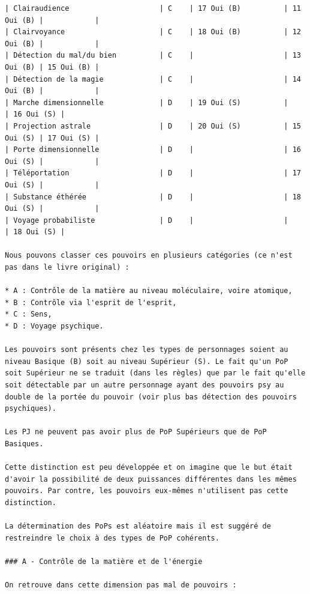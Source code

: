 \documentclass[12pt]{article}
\begin{document}
{\begin{verbatim}
| Clairaudience                     | C    | 17 Oui (B)          | 11 Oui (B) |            |
| Clairvoyance                      | C    | 18 Oui (B)          | 12 Oui (B) |            |
| Détection du mal/du bien          | C    |                     | 13 Oui (B) | 15 Oui (B) |
| Détection de la magie             | C    |                     | 14 Oui (B) |            |
| Marche dimensionnelle             | D    | 19 Oui (S)          |            | 16 Oui (S) |
| Projection astrale                | D    | 20 Oui (S)          | 15 Oui (S) | 17 Oui (S) |
| Porte dimensionnelle              | D    |                     | 16 Oui (S) |            |
| Téléportation                     | D    |                     | 17 Oui (S) |            |
| Substance éthérée                 | D    |                     | 18 Oui (S) |            |
| Voyage probabiliste               | D    |                     |            | 18 Oui (S) |

Nous pouvons classer ces pouvoirs en plusieurs catégories (ce n'est pas dans le livre original) :

* A : Contrôle de la matière au niveau moléculaire, voire atomique,
* B : Contrôle via l'esprit de l'esprit,
* C : Sens,
* D : Voyage psychique.

Les pouvoirs sont présents chez les types de personnages soient au niveau Basique (B) soit au niveau Supérieur (S). Le fait qu'un PoP soit Supérieur ne se traduit (dans les règles) que par le fait qu'elle soit détectable par un autre personnage ayant des pouvoirs psy au double de la portée du pouvoir (voir plus bas détection des pouvoirs psychiques).

Les PJ ne peuvent pas avoir plus de PoP Supérieurs que de PoP Basiques.

Cette distinction est peu développée et on imagine que le but était d'avoir la possibilité de deux puissances différentes dans les mêmes pouvoirs. Par contre, les pouvoirs eux-mêmes n'utilisent pas cette distinction.

La détermination des PoPs est aléatoire mais il est suggéré de restreindre le choix à des types de PoP cohérents.

### A - Contrôle de la matière et de l'énergie

On retrouve dans cette dimension pas mal de pouvoirs :


\end{verbatim}}
\end{document}
